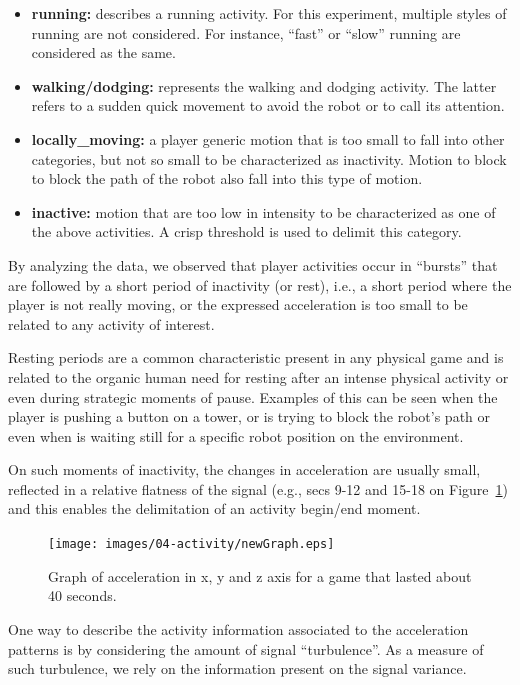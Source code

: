 \begin{itemize}
\item  \textbf{running:} describes a running activity. For this experiment, multiple styles of running are not considered. For instance, ``fast'' or ``slow'' running are considered as the same.
\item \textbf{walking/dodging:} represents the walking and dodging activity. The latter refers to a sudden quick movement to avoid the robot or to call its attention.
\item  \textbf{locally\_moving:} a player generic motion that is too small to fall into other categories, but not so small to be characterized as inactivity. Motion to block to block the path of the robot also fall into this type of motion.
\item  \textbf{inactive:} motion that are too low in intensity to be characterized as one of the above activities. A crisp threshold is used to delimit this category. 
\end{itemize}

By analyzing the data, we observed that player activities occur in ``bursts'' that are followed by a short period of inactivity (or rest), i.e., a short period where the player is not really moving, or the expressed acceleration is too small to be related to any activity of interest.

Resting periods are a common characteristic present in any physical game and is related to the organic human need for resting after an intense physical activity or even during strategic moments of pause. Examples of this can be seen when the player is pushing a button on a tower, or is trying to block the robot's path or even when is waiting still for a specific robot position on the environment.

On such moments of inactivity, the changes in acceleration are usually small, reflected in a relative flatness of the signal (e.g., secs 9-12 and 15-18 on Figure~\ref{acc_graph}) and this enables the delimitation of an activity begin/end moment.

\begin{figure}[h]
      \centering
      \texttt{[image: images/04-activity/newGraph.eps]}
      \caption{Graph of acceleration in x, y and z axis for a game that lasted about 40 seconds.}
      \label{acc_graph}
\end{figure}

One way to describe the activity information associated to the acceleration patterns is by considering the amount of signal ``turbulence''. As a measure of such turbulence, we rely on the information present on the signal variance. 


